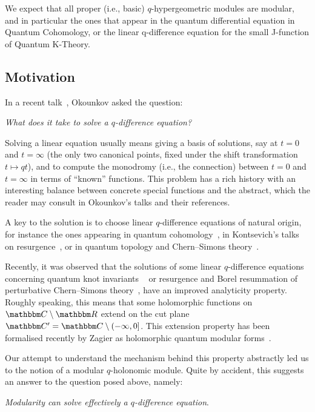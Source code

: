 \documentclass[12pt,reqno]{amsart}
\theoremstyle{definition}
\def\BR{\mathbbm R}
\def\BC{\mathbbm C}
\begin{document}
We expect that all proper (i.e., basic) $q$-hypergeometric modules are modular, and
in particular the ones that appear in the quantum differential equation in Quantum
Cohomology, or the linear q-difference equation for the small J-function of
Quantum K-Theory.

\subsection{Motivation}
  
In a recent talk~\cite{Okounkov:talk,Okounkov:notes}, Okounkov asked the
question:

\begin{center}
\emph{What does it take to solve a $q$-difference equation?}
\end{center}

Solving a linear equation usually means giving a basis of solutions,
say at $t=0$ and $t=\infty$ (the only two canonical points, fixed under the
shift transformation
$t \mapsto q t$), and to compute the monodromy (i.e., the connection)
between $t=0$ and $t=\infty$ in
terms of ``known'' functions. This problem has a rich history
with an interesting balance between concrete special functions and the abstract,
which the reader may consult in Okounkov's talks and their references.

A key to the solution is to choose linear $q$-difference equations of natural
origin, for instance the ones appearing in quantum cohomology~\cite{OP},
in Kontsevich's talks on resurgence~\cite{Kontsevich:talks}, or in
quantum topology and Chern--Simons theory~\cite{Ga:CS,GL}.

Recently, it was observed that the solutions of some 
linear $q$-difference equations concerning quantum knot invariants
~\cite{GZ:qseries,GZ:kashaev} or resurgence and Borel resummation of
perturbative Chern--Simons theory~\cite{GGM:peacock,GGM,GGMW:trivial}, have
an improved analyticity property. Roughly speaking, this means that 
some holomorphic functions on $\BC\setminus\BR$ extend on the cut plane
$\BC'=\BC\setminus (-\infty,0]$. This extension property has been formalised recently
by Zagier as holomorphic quantum modular forms~\cite{Z:HQMF}.

Our attempt to understand the mechanism behind this property abstractly led
us to the notion of a modular $q$-holonomic module. Quite by accident, this
suggests an answer to the question posed above, namely:

\begin{center}
\emph{Modularity can solve effectively a $q$-difference equation}. 
\end{center}
\end{document}
